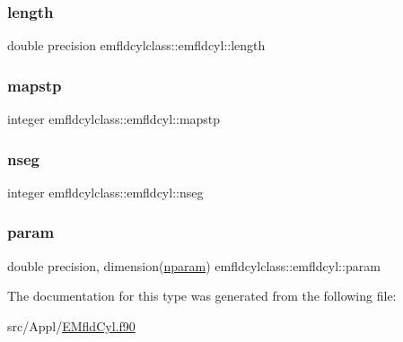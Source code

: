 \subsubsection{\texorpdfstring{length}{length}}
{\footnotesize\ttfamily double precision emfldcylclass\+::emfldcyl\+::length}

\mbox{\label{structemfldcylclass_1_1emfldcyl_ae91a238805ec7c8877fe7678af96d14f}} 
\subsubsection{\texorpdfstring{mapstp}{mapstp}}
{\footnotesize\ttfamily integer emfldcylclass\+::emfldcyl\+::mapstp}

\mbox{\label{structemfldcylclass_1_1emfldcyl_a0e3fc4ea59fb87362a87c87bd7381c99}} 
\subsubsection{\texorpdfstring{nseg}{nseg}}
{\footnotesize\ttfamily integer emfldcylclass\+::emfldcyl\+::nseg}

\mbox{\label{structemfldcylclass_1_1emfldcyl_aae12b122be9447025032a7afbb39d0ff}} 
\subsubsection{\texorpdfstring{param}{param}}
{\footnotesize\ttfamily double precision, dimension(\mbox{\hyperlink{namespaceemfldcylclass_a4b336ecf0cd4052beb8ac386391e19e9}{nparam}}) emfldcylclass\+::emfldcyl\+::param}



The documentation for this type was generated from the following file\+:\begin{DoxyCompactItemize}
\item 
src/\+Appl/\mbox{\hyperlink{_e_mfld_cyl_8f90}{E\+Mfld\+Cyl.\+f90}}\end{DoxyCompactItemize}
